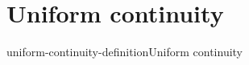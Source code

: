 \documentclass[preview]{standalone}
\begin{document}
\genpage

\section{Uniform continuity}

\begin{snippetdefinition}{uniform-continuity-definition}{Uniform continuity}
    \todo
\end{snippetdefinition}
\end{document}
